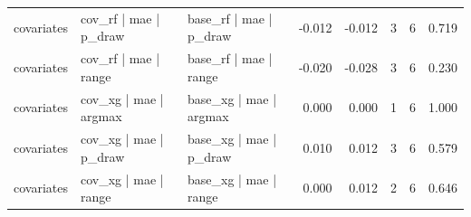 \begin{tabular}{lllrrrrr}
covariates & cov\_rf | mae | p\_draw & base\_rf | mae | p\_draw & -0.012 & -0.012 & 3 & 6 & 0.719\\
covariates & cov\_rf | mae | range & base\_rf | mae | range & -0.020 & -0.028 & 3 & 6 & 0.230\\
covariates & cov\_xg | mae | argmax & base\_xg | mae | argmax & 0.000 & 0.000 & 1 & 6 & 1.000\\
covariates & cov\_xg | mae | p\_draw & base\_xg | mae | p\_draw & 0.010 & 0.012 & 3 & 6 & 0.579\\
covariates & cov\_xg | mae | range & base\_xg | mae | range & 0.000 & 0.012 & 2 & 6 & 0.646\\
\bottomrule
\end{tabular}

